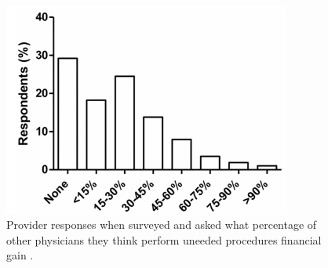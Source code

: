 \documentclass{article}
\begin{document}
\begin{figure}
\includegraphics[height=7cm]{overtreat}
\centering
\caption{Provider responses when surveyed and asked what percentage of other physicians they think perform uneeded procedures financial gain \cite{overtreat}.}
\label{fig:overtreat}
\end{figure}


\clearpage
\end{document}

